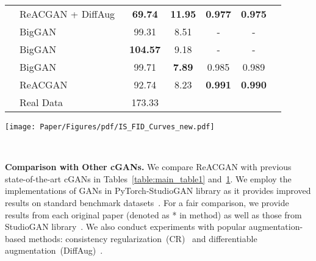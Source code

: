 \documentclass{article}
\begin{document}
\begin{table}[t!]
\begin{minipage}[b]{0.50\linewidth}
{\begin{tabular}{clccccc}
    & \cellcolor{yellow!20}ReACGAN + DiffAug~\cite{zhao2020differentiable} & \cellcolor{yellow!20}\textbf{69.74} & \cellcolor{yellow!20}\textbf{11.95} & \cellcolor{yellow!20}\textbf{0.977} & \cellcolor{yellow!20}\textbf{0.975} &\\
    \cmidrule[1.0pt]{2-6}
    \parbox[t]{2mm}{}
    & BigGAN~\cite{Brock2019LargeSG} & 99.31 & 8.51 & - & - &\\
    & BigGAN~\cite{zhou2020omni} & \textbf{104.57} & 9.18 & - & - &\\
    & BigGAN~\cite{Brock2019LargeSG} & 99.71  & \textbf{7.89} & 0.985 & 0.989 &\\
    & ReACGAN & 92.74 & 8.23 & \textbf{0.991} & \textbf{0.990} &\\
    & Real Data & 173.33 &  &  & & \\ 
    \end{tabular}}
    \label{table:student}
\end{minipage} 
\begin{minipage}[t]{0.49\linewidth}
    \centering
    \texttt{[image: Paper/Figures/pdf/IS\_FID\_Curves\_new.pdf]}
    \label{fig:image}
\end{minipage}
\\
\label{table:main_table2}
\vspace{-7mm}
\end{table} \textbf{Comparison with Other cGANs.}  We compare ReACGAN with previous state-of-the-art cGANs in Tables~\ref{table:main_table1} and~\ref{table:main_table2}. 
We employ the implementations of GANs in PyTorch-StudioGAN library as it provides improved results on standard benchmark datasets~\cite{Krizhevsky2009LearningML, Deng2009ImageNetAL}. For a fair comparison, we provide results from each original paper (denoted as * in method) as well as those from StudioGAN library~\cite{studiogan}. We also conduct experiments with popular augmentation-based methods: consistency regularization~(CR)~\cite{Zhang2019ConsistencyRF} and differentiable augmentation~(DiffAug)~\cite{zhao2020differentiable}.
\end{document}
